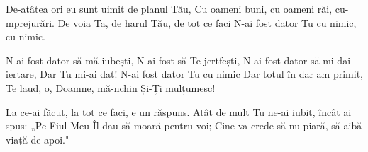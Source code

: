 
\beginverse
De-atâtea ori eu sunt uimit de planul Tău,
Cu oameni buni, cu oameni răi, cu-mprejurări.
De voia Ta, de harul Tău, de tot ce faci
N-ai fost dator Tu cu nimic, cu nimic.
\endverse

\beginchorus
N-ai fost dator să mă iubești,
N-ai fost să Te jertfești,
N-ai fost dator să-mi dai iertare,
Dar Tu mi-ai dat!
N-ai fost dator Tu cu nimic
Dar totul în dar am primit,
Te laud, o, Doamne, mă-nchin
Și-Ți mulțumesc!
\endchorus

\beginverse
La ce-ai făcut, la tot ce faci, e un răspuns.
Atât de mult Tu ne-ai iubit, încât ai spus:
„Pe Fiul Meu Îl dau să moară pentru voi;
Cine va crede să nu piară, să aibă viață de-apoi."
\endverse

\endsong

